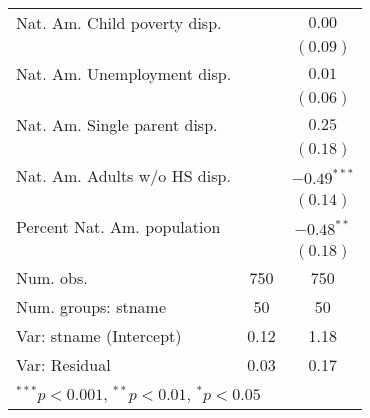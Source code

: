 \begin{table}
\begin{center}
\begin{tabular}{l c c }
Nat. Am. Child poverty disp. &             & $0.00$        \\
                             &             & $(0.09)$      \\
Nat. Am. Unemployment disp.  &             & $0.01$        \\
                             &             & $(0.06)$      \\
Nat. Am. Single parent disp. &             & $0.25$        \\
                             &             & $(0.18)$      \\
Nat. Am. Adults w/o HS disp. &             & $-0.49^{***}$ \\
                             &             & $(0.14)$      \\
Percent Nat. Am. population  &             & $-0.48^{**}$  \\
                             &             & $(0.18)$      \\
\hline
Num. obs.                    & 750         & 750           \\
Num. groups: stname          & 50          & 50            \\
Var: stname (Intercept)      & 0.12        & 1.18          \\
Var: Residual                & 0.03        & 0.17          \\
\hline
\multicolumn{3}{l}{\scriptsize{$^{***}p<0.001$, $^{**}p<0.01$, $^*p<0.05$}}
\end{tabular}
\label{disp-models}
\end{center}
\end{table}
